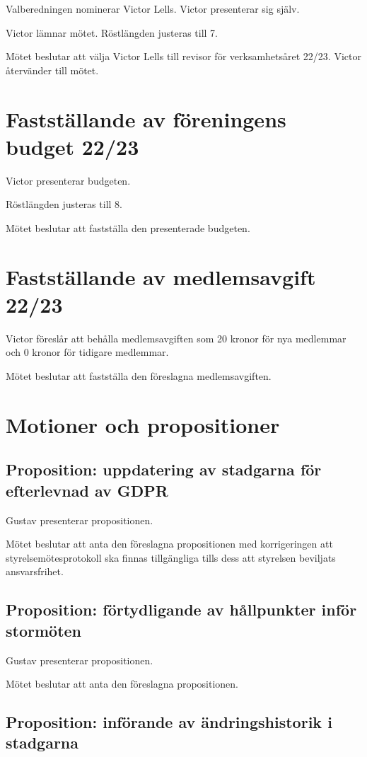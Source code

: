 \documentclass[a4paper]{article}
\begin{document}
Valberedningen nominerar Victor Lells. Victor presenterar sig själv.

Victor lämnar mötet. Röstlängden justeras till 7.

Mötet beslutar att välja Victor Lells till revisor för verksamhetsåret 22/23. Victor
återvänder till mötet.

\section{Fastställande av föreningens budget 22/23}

Victor presenterar budgeten.

Röstlängden justeras till 8.

Mötet beslutar att fastställa den presenterade budgeten.

\section{Fastställande av medlemsavgift 22/23}

Victor föreslår att behålla medlemsavgiften som 20 kronor för nya medlemmar och
0 kronor för tidigare medlemmar.

Mötet beslutar att fastställa den föreslagna medlemsavgiften.

\section{Motioner och propositioner}

\subsection{Proposition: uppdatering av stadgarna för efterlevnad av GDPR}

Gustav presenterar propositionen.

Mötet beslutar att anta den föreslagna propositionen med korrigeringen att
styrelsemötesprotokoll ska finnas tillgängliga tills dess att styrelsen
beviljats ansvarsfrihet.

\subsection{Proposition: förtydligande av hållpunkter inför stormöten}

Gustav presenterar propositionen.

Mötet beslutar att anta den föreslagna propositionen.

\subsection{Proposition: införande av ändringshistorik i stadgarna}
\end{document}
